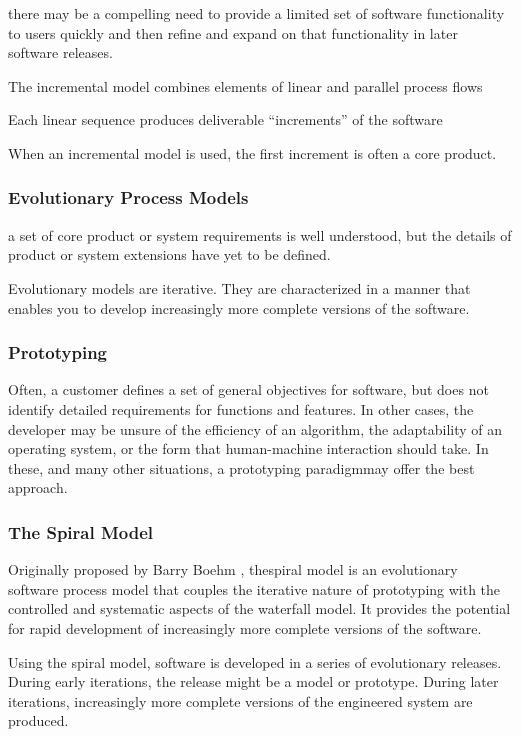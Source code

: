 \documentclass[12pt]{article}
\begin{document}
there may be a compelling need to provide a limited set of software functionality to users quickly and then refine and expand on that functionality
in later software releases.

The incremental model combines elements of linear and parallel process flows

Each linear sequence
produces deliverable “increments” of the software

When an incremental model is used, the first increment is often a core product.



\newpage

\subsubsection{Evolutionary Process Models}

a set of core product or system requirements
is well understood, but the details of product or system extensions have yet to be
defined.

Evolutionary models are iterative. They are characterized in a manner that
enables you to develop increasingly more complete versions of the software.




\subsubsection{Prototyping}
Often, a customer defines a set of general objectives for software,
but does not identify detailed requirements for functions and features. In other
cases, the developer may be unsure of the efficiency of an algorithm, the adaptability of an operating system, or the form that human-machine interaction should
take. In these, and many other situations, a prototyping paradigmmay offer the best
approach.




\subsubsection{The Spiral Model}

Originally proposed by Barry Boehm , thespiral model is an evolutionary software process model that couples the iterative nature of prototyping with the controlled and systematic aspects of the waterfall model. It provides
the potential for rapid development of increasingly more complete versions of the
software. 

Using the spiral model, software is developed in a series of evolutionary releases.
During early iterations, the release might be a model or prototype. During later iterations, increasingly more complete versions of the engineered system are produced.
\end{document}
